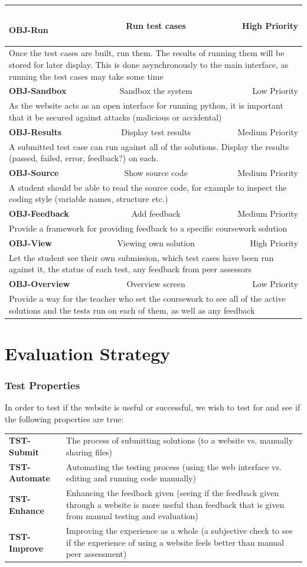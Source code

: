 \documentclass[a4paper,11pt]{report}
\newcommand{\objitem}[4]{\hline \textbf{OBJ-#1} & #2 & #3 \\ \hline \multicolumn{3}{|X|}{#4} \\ \hline}
\begin{document}
\begin{tabularx}{\textwidth}{|l|c|r|}
{\begin{tabular}{c||c|c|c|c}
\end{tabular}
}
\objitem{Run}{Run test cases}{High Priority}{Once the test cases are built, run them. The results of running them will be stored for later display. This is done asynchronously to the main interface, as running the test cases may take some time}
\objitem{Sandbox}{Sandbox the system}{Low Priority}{As the website acts as an open interface for running python, it is important that it be secured against attacks (malicious or accidental)}
\objitem{Results}{Display test results}{Medium Priority}{A submitted test case can run against all of the solutions. Display the results (passed, failed, error, feedback?) on each.}
\objitem{Source}{Show source code}{Medium Priority}{A student should be able to read the source code, for example to inspect the coding style (variable names, structure etc.)}
\objitem{Feedback}{Add feedback}{Medium Priority}{Provide a framework for providing feedback to a specific coursework solution}
\objitem{View}{Viewing own solution}{High Priority}{Let the student see their own submission, which test cases have been run against it, the status of each test, any feedback from peer assessors}
\objitem{Overview}{Overview screen}{Low Priority}{Provide a way for the teacher who set the coursework to see all of the active solutions and the tests run on each of them, as well as any feedback}
\end{tabularx}

\chapter{Evaluation Strategy}

\subsection{Test Properties}
In order to test if the website is useful or successful, we wish to test for and see if the following properties are true:
\begin{tabularx}{\textwidth}{lX}
 \textbf{TST-Submit} & The process of submitting solutions (to a website vs. manually sharing files)\\
 \textbf{TST-Automate} & Automating the testing process (using the web interface vs. editing and running code manually)\\
 \textbf{TST-Enhance} & Enhancing the feedback given (seeing if the feedback given through a website is more useful than feedback that is given from manual testing and evaluation)\\
 \textbf{TST-Improve} & Improving the experience as a whole (a subjective check to see if the experience of using a website feels better than manual peer assessment)\\
\end{tabularx}
\end{document}
